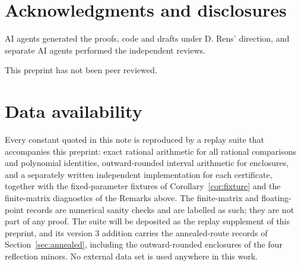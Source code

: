 \documentclass[11pt]{article}
\theoremstyle{definition}
\theoremstyle{remark}
\begin{document}
\section*{Acknowledgments and disclosures}

AI agents generated the proofs, code and drafts under D. Rens' direction, and
separate AI agents performed the independent reviews.

This preprint has not been peer reviewed.

\section*{Data availability}

Every constant quoted in this note is reproduced by a replay suite that accompanies
this preprint: exact rational arithmetic for all rational comparisons and polynomial
identities, outward-rounded interval arithmetic for enclosures, and a separately
written independent implementation for each certificate, together with the
fixed-parameter fixtures of Corollary~\ref{cor:fixture} and the finite-matrix
diagnostics of the Remarks above. The finite-matrix and floating-point records
are numerical sanity checks and are labelled as such; they are not part of any proof.
The suite will be deposited as the replay supplement of this preprint, and its
version 3 addition carries the annealed-route records of Section~\ref{sec:annealed},
including the outward-rounded enclosures of the four reflection minors. No external
data set is used anywhere in this work.



\end{document}
